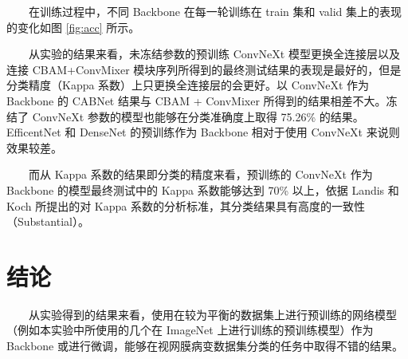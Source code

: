 \documentclass[twocolumn, fontsize=10pt]{article}
\begin{document}
　　在训练过程中，不同 Backbone 在每一轮训练在 train 集和 valid 集上的表现的变化如图 \ref{fig:acc}  所示。

　　从实验的结果来看，未冻结参数的预训练 ConvNeXt 模型更换全连接层以及连接 CBAM+ConvMixer 模块序列所得到的最终测试结果的表现是最好的，但是分类精度（Kappa 系数）上只更换全连接层的会更好。以 ConvNeXt 作为 Backbone 的 CABNet 结果与 CBAM + ConvMixer 所得到的结果相差不大。冻结了 ConvNeXt 参数的模型也能够在分类准确度上取得 75.26\% 的结果。EfficentNet 和 DenseNet 的预训练作为 Backbone 相对于使用 ConvNeXt 来说则效果较差。

　　而从 Kappa 系数的结果即分类的精度来看，预训练的 ConvNeXt 作为 Backbone 的模型最终测试中的 Kappa 系数能够达到 70\% 以上，依据 Landis 和 Koch 所提出的对 Kappa 系数的分析标准\cite{landis1977}，其分类结果具有高度的一致性（Substantial）。

\section{结论}

　　从实验得到的结果来看，使用在较为平衡的数据集上进行预训练的网络模型（例如本实验中所使用的几个在 ImageNet 上进行训练的预训练模型）作为 Backbone 或进行微调，能够在视网膜病变数据集分类的任务中取得不错的结果。

\nocite{*}


\end{document}
